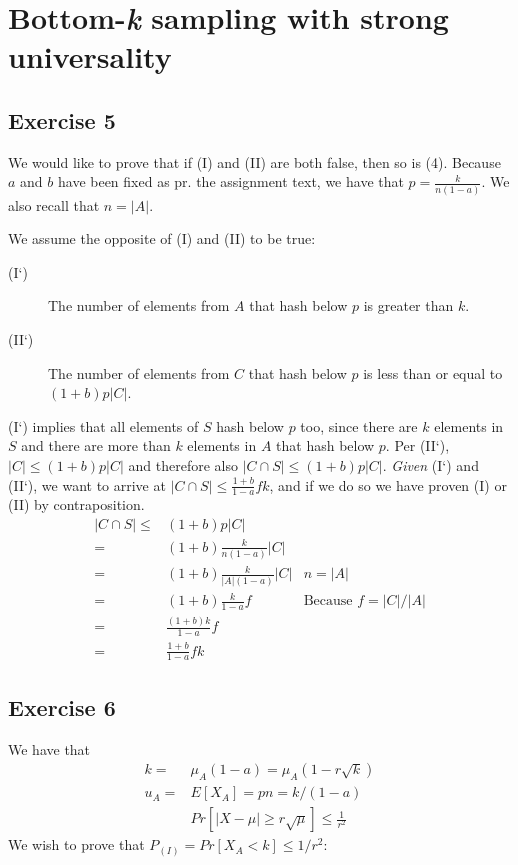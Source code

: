 \section{Bottom-\textit{k} sampling with strong universality}
\subsection{Exercise 5}
We would like to prove that if (I) and (II) are both false, then 
so is (4). Because $a$ and $b$ have been fixed as pr. the
assignment text, we have that $p=\frac{k}{n(1-a)}$. We also recall
that $n=|A|$.

We assume the opposite of (I) and (II) to be true:
%
\begin{description}
	\item[(I`)] The number of elements from $A$ that hash below $p$
	is greater than $k$.
	\item[(II`)] The number of elements from $C$ that hash below $p$
	is less than or equal to $(1+b) p |C|$.
\end{description}
%
(I`) implies that all elements of $S$ hash below $p$ too, since there are $k$
elements in $S$ and there are more than $k$ elements in $A$ that hash below
$p$. Per (II`), $|C|\leq (1+b)p|C|$ and therefore also 
$|C \cap S| \leq (1+b)p|C|$. \textit{Given} (I`) and (II`), we want to arrive 
at $|C \cap S| \leq \frac{1+b}{1-a} fk$, and if we do so we have proven (I) 
or (II) by contraposition.
%
\begin{align*}
	|C \cap S| 	\leq & (1+b)p|C| & \\
				=& (1+b) \frac{k}{n(1-a)} |C| & \\
				=& (1+b) \frac{k}{|A|(1-a)} |C| & \text{$n=|A|$}\\
				=& (1+b) \frac{k}{1-a} f & \text{Because $f=|C|/|A|$}\\
				=& \frac{(1+b)k}{1-a} f & \\
				=& \frac{1+b}{1-a} fk & 
\end{align*}

\subsection{Exercise 6}
We have that
%
\begin{align}
	k =& \mu_A(1-a) = \mu_A(1 - r \sqrt{k}) \label{eq:6:k} \\
	u_A =& E[X_A] = pn = k/(1-a) \label{eq:6:ua} \\
	& Pr\left[ |X - \mu| \geq r \sqrt{\mu} \right] \leq \frac{1}{r^2} \label{eq:6:pr}
\end{align}
%
We wish to prove that $P_{(I)} = Pr \left[ X_A < k\right] \leq 1/r^2$:

